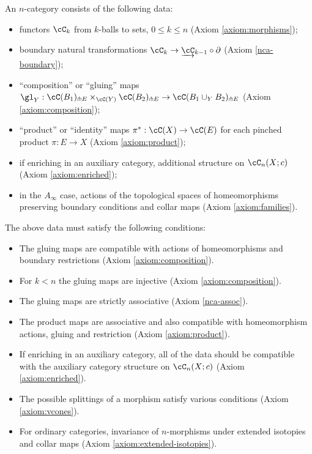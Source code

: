An $n$-category consists of the following data:
\begin{itemize}
\item functors $\cC_k$ from $k$-balls to sets, $0\le k\le n$ (Axiom \ref{axiom:morphisms});
\item boundary natural transformations $\cC_k \to \cl{\cC}_{k-1} \circ \bd$ (Axiom \ref{nca-boundary});
\item ``composition'' or ``gluing'' maps $\gl_Y : \cC(B_1)\trans E \times_{\cC(Y)} \cC(B_2)\trans E \to \cC(B_1\cup_Y B_2)\trans E$ (Axiom \ref{axiom:composition});
\item ``product'' or ``identity'' maps $\pi^*:\cC(X)\to \cC(E)$ for each pinched product $\pi:E\to X$ (Axiom \ref{axiom:product});
\item if enriching in an auxiliary category, additional structure on $\cC_n(X; c)$ (Axiom \ref{axiom:enriched});
\item in the $A_\infty$ case, actions of the topological spaces of homeomorphisms preserving boundary conditions
and collar maps (Axiom \ref{axiom:families}).
\end{itemize}
The above data must satisfy the following conditions:
\begin{itemize}
\item The gluing maps are compatible with actions of homeomorphisms and boundary 
restrictions (Axiom \ref{axiom:composition}).
\item For $k<n$ the gluing maps are injective (Axiom \ref{axiom:composition}).
\item The gluing maps are strictly associative (Axiom \ref{nca-assoc}).
\item The product maps are associative and also compatible with homeomorphism actions, gluing and restriction (Axiom \ref{axiom:product}).
\item If enriching in an auxiliary category, all of the data should be compatible 
with the auxiliary category structure on $\cC_n(X; c)$ (Axiom \ref{axiom:enriched}).
\item The possible splittings of a morphism satisfy various conditions (Axiom \ref{axiom:vcones}).
\item For ordinary categories, invariance of $n$-morphisms under extended isotopies 
and collar maps (Axiom \ref{axiom:extended-isotopies}).
\end{itemize}


